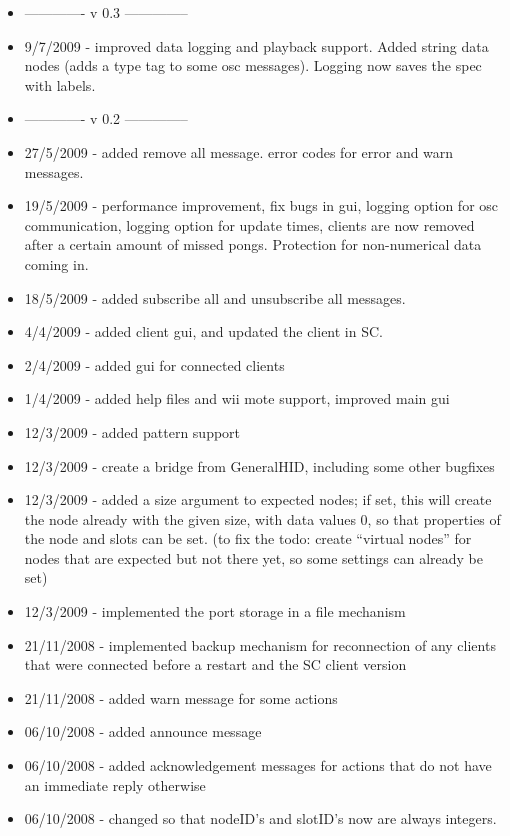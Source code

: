 \documentclass[letterpaper,10pt]{article}
\begin{document}
\begin{itemize}
 \item ------------- v 0.3 --------------
 \item 9/7/2009 - improved data logging and playback support. Added string data nodes (adds a type tag to some osc messages). Logging now saves the spec with labels.
 \item ------------- v 0.2 --------------
 \item 27/5/2009 - added remove all message. error codes for error and warn messages.
 \item 19/5/2009 - performance improvement, fix bugs in gui, logging option for osc communication, logging option for update times, clients are now removed after a certain amount of missed pongs. Protection for non-numerical data coming in.
 \item 18/5/2009 - added subscribe all and unsubscribe all messages.
 \item 4/4/2009 - added client gui, and updated the client in SC.
 \item 2/4/2009 - added gui for connected clients
 \item 1/4/2009 - added help files and wii mote support, improved main gui
 \item 12/3/2009 - added pattern support
 \item 12/3/2009 - create a bridge from GeneralHID, including some other bugfixes
 \item 12/3/2009 - added a size argument to expected nodes; if set, this will create the node already with the given size, with data values 0, so that properties of the node and slots can be set. (to fix the todo: create ``virtual nodes'' for nodes that are expected but not there yet, so some settings can already be set)
 \item 12/3/2009 - implemented the port storage in a file mechanism
 \item 21/11/2008 - implemented backup mechanism for reconnection of any clients that were connected before a restart and the SC client version
 \item 21/11/2008 - added warn message for some actions
 \item 06/10/2008 - added announce message
 \item 06/10/2008 - added acknowledgement messages for actions that do not have an immediate reply otherwise
 \item 06/10/2008 - changed so that nodeID's and slotID's now are always integers.
\end{itemize}
\end{document}
